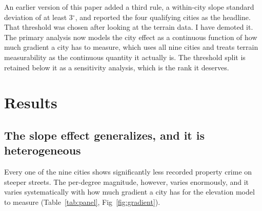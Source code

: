 \documentclass[10pt,letterpaper]{article}
\begin{document}
An earlier version of this paper added a third rule, a within-city slope standard
deviation of at least 3$^\circ$, and reported the four qualifying cities as the
headline. That threshold was chosen after looking at the terrain data. I have
demoted it. The primary analysis now models the city effect as a continuous
function of how much gradient a city has to measure, which uses all nine cities and
treats terrain measurability as the continuous quantity it actually is. The
threshold split is retained below it as a sensitivity analysis, which is the rank
it deserves.

\section*{Results}

\subsection*{The slope effect generalizes, and it is heterogeneous}

Every one of the nine cities shows significantly less recorded property crime on
steeper streets. The per-degree magnitude, however, varies enormously, and it varies
systematically with how much gradient a city has for the elevation model to measure
(Table~\ref{tab:panel}, Fig~\ref{fig:gradient}).
\end{document}
